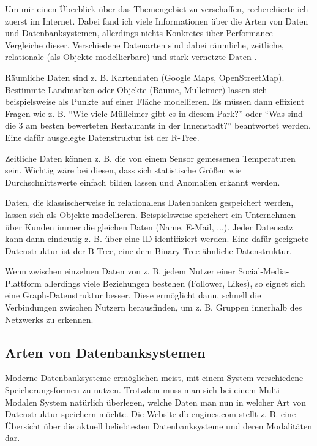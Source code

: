 \documentclass[11pt,a4paper]{article}
\begin{document}
Um mir einen Überblick über das Themengebiet zu verschaffen, recherchierte ich zuerst
im Internet. Dabei fand ich viele Informationen über die Arten von Daten und
Datenbanksystemen, allerdings nichts Konkretes über Performance-Vergleiche dieser.
Verschiedene Datenarten sind dabei räumliche, zeitliche, relationale (als Objekte modellierbare) und stark vernetzte Daten
\cite{no_sql_wikipedia} \cite{indian_overview}.

\vspace*{0.3cm}

Räumliche Daten sind z. B. Kartendaten (Google Maps, OpenStreetMap). Bestimmte Landmarken oder Objekte
(Bäume, Mulleimer) lassen sich beispielsweise als Punkte auf einer Fläche modellieren.
Es müssen dann effizient Fragen wie z. B. ``Wie viele Mülleimer gibt es in diesem Park?'' oder ``Was sind
die 3 am besten bewerteten Restaurants in der Innenstadt?'' beantwortet werden.
Eine dafür ausgelegte Datenstruktur ist der R-Tree.

\vspace*{0.3cm}

Zeitliche Daten können z. B. die von einem Sensor gemessenen Temperaturen sein.
Wichtig wäre bei diesen, dass sich statistische Größen wie Durchschnittswerte einfach
bilden lassen und Anomalien erkannt werden.

\vspace*{0.3cm}

Daten, die klassischerweise in relationalens Datenbanken gespeichert werden,
lassen sich als Objekte modellieren.
Beispielsweise speichert ein Unternehmen über Kunden immer die gleichen Daten
(Name, E-Mail, ...). Jeder Datensatz kann dann eindeutig z. B. über eine
ID identifiziert werden. Eine dafür geeignete Datenstruktur ist der B-Tree, eine
dem Binary-Tree ähnliche Datenstruktur.

\vspace*{0.3cm}

Wenn zwischen einzelnen Daten von z. B. jedem Nutzer einer Social-Media-Plattform
allerdings viele Beziehungen bestehen (Follower, Likes), so eignet sich eine
Graph-Datenstruktur besser. Diese ermöglicht dann, schnell die Verbindungen
zwischen Nutzern herausfinden, um z. B. Gruppen innerhalb des Netzwerks zu erkennen.

\subsection{Arten von Datenbanksystemen}

Moderne Datenbanksysteme ermöglichen meist, mit einem System verschiedene
Speicherungsformen zu nutzen. Trotzdem muss man sich bei einem Multi-Modalen System
natürlich überlegen, welche Daten man nun in welcher Art von Datenstruktur speichern
möchte. Die Website \href{https://db-engines.com/en/ranking}{db-engines.com} stellt z. B.
eine Übersicht über die aktuell beliebtesten Datenbanksysteme und deren Modalitäten dar.
\end{document}
